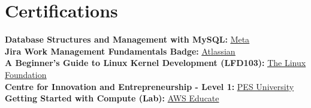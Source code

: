 \documentclass[letterpaper,11pt]{article}
\begin{document}
\section{Certifications}
\begin{itemize}[leftmargin=0.15in, label={}]
    \small{\item{

    \textbf{Database Structures and Management with MySQL:}{ \href{https://drive.google.com/file/d/1yk1cgDVw4zl7LSJ7ZCwm0mTG6D1OUiyl/view?usp=sharing}{\color{blue}\underline{Meta}} }\\

\textbf{Jira Work Management Fundamentals Badge:}{ \href{https://university.atlassian.com/student/award/YUXGUbPbH1wfKhPqoE3UvJ1E}{\color{blue}\underline{Atlassian}}} \\
    
     \textbf{A Beginner's Guide to Linux Kernel Development (LFD103):}{ \href{https://drive.google.com/file/d/1Rc3an_g4eF2UVKEvh6tCYHMYul08s1O3/view?usp=sharing}{\color{blue}\underline{The Linux Foundation}}} \\
     
     \textbf{Centre for Innovation and Entrepreneurship -  Level 1: }\href{https://drive.google.com/file/d/1TqpBAXJ2q6YzqMNAOdY6SA-zIz7lrH5G/view?usp=sharing}{\color{blue}\underline{PES University}} \\

    \textbf{Getting Started with Compute (Lab): }{\color{blue}\underline{AWS Educate}} \\

    }}
 \end{itemize}
\end{document}
